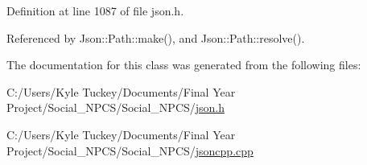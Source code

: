 Definition at line 1087 of file json.\+h.



Referenced by Json\+::\+Path\+::make(), and Json\+::\+Path\+::resolve().



The documentation for this class was generated from the following files\+:\begin{DoxyCompactItemize}
\item 
C\+:/\+Users/\+Kyle Tuckey/\+Documents/\+Final Year Project/\+Social\+\_\+\+N\+P\+C\+S/\+Social\+\_\+\+N\+P\+C\+S/\hyperlink{json_8h}{json.\+h}\item 
C\+:/\+Users/\+Kyle Tuckey/\+Documents/\+Final Year Project/\+Social\+\_\+\+N\+P\+C\+S/\+Social\+\_\+\+N\+P\+C\+S/\hyperlink{jsoncpp_8cpp}{jsoncpp.\+cpp}\end{DoxyCompactItemize}
